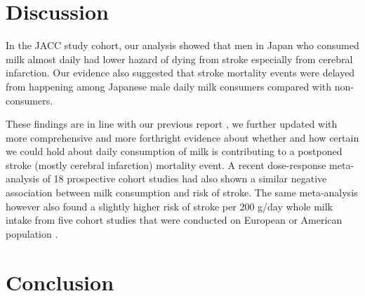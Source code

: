 \documentclass[nutrients,article,submit,moreauthors,pdftex]{mdpi}
\begin{document}
\hypertarget{discussion}{%
\section{Discussion}\label{discussion}}

In the JACC study cohort, our analysis showed that men in Japan who
consumed milk almost daily had lower hazard of dying from stroke
especially from cerebral infarction. Our evidence also suggested that
stroke mortality events were delayed from happening among Japanese male
daily milk consumers compared with non-consumers.

These findings are in line with our previous report
\citep{wang_milk_2015}, we further updated with more comprehensive and
more forthright evidence about whether and how certain we could hold
about daily consumption of milk is contributing to a postponed stroke
(mostly cerebral infarction) mortality event. A recent dose-response
meta-analysis of 18 prospective cohort studies had also shown a similar
negative association \citep{DeGoede2016} between milk consumption and
risk of stroke. The same meta-analysis however also found a slightly
higher risk of stroke per 200 g/day whole milk intake from five cohort
studies that were conducted on European or American population
\citep{goldbohm2011dairy, Iso1999}.

\hypertarget{conclusion}{%
\section{Conclusion}\label{conclusion}}
\end{document}
